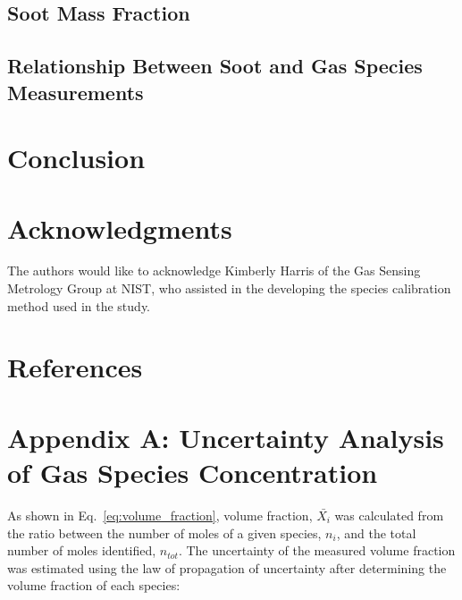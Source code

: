 \documentclass[12pt]{article}
\begin{document}
\subsection{Soot Mass Fraction}
\label{ssec:Soot_Mass_Fraction}

\subsection{Relationship Between Soot and Gas Species Measurements}
\label{ssec:Relationship_Between_Soot_and_Gas_Species_Measurements}

\section{Conclusion}
\label{sec:Conclusion}

\section*{Acknowledgments}
\noindent The authors would like to acknowledge Kimberly Harris of the Gas Sensing Metrology Group at NIST, who assisted in the developing the species calibration method used in the study.

\pagebreak

\section*{References}




\pagebreak


\appendix
{}
\makeatletter
\newcommand{\section@cntformat}{Appendix:\ }
\makeatother

\section{Appendix A: Uncertainty Analysis of Gas Species Concentration} \label{sec:UncertaintyGasSpecies}

As shown in Eq.~\ref{eq:volume_fraction}, volume fraction, $\bar{X_{i}}$ was calculated from the ratio between the number of moles of a given species, $n_{i}$, and the total number of moles identified, $n_{tot}$. The uncertainty of the measured volume fraction was estimated using the law of propagation of uncertainty after determining the volume fraction of each species:
\end{document}

